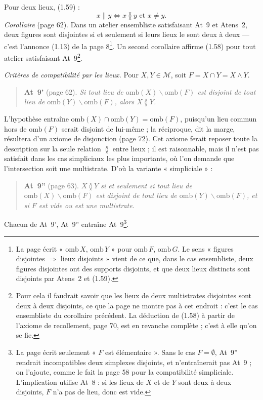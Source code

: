 \documentclass[11pt,a4paper]{article}
\begin{document}
Pour deux lieux, (1.59) :
\[
x \parallel y \iff x \between y \text{ et } x \neq y .
\]
\emph{Corollaire} (page 62). Dans un atelier ensembliste satisfaisant At~9 et
Atens~2, deux figures sont disjointes si et seulement si leurs lieux le sont deux
à deux --- c'est l'annonce (1.13) de la page 8\footnote{La page écrit
« $\mathrm{omb}\,X$, $\mathrm{omb}\,Y$ » pour $\mathrm{omb}\,F$,
$\mathrm{omb}\,G$. Le sens « figures disjointes $\Rightarrow$ lieux disjoints »
vient de ce que, dans le cas ensembliste, deux figures disjointes ont des
supports disjoints, et que deux lieux distincts sont disjoints par Atens~2 et
(1.59).}. Un second corollaire affirme (1.58) pour tout atelier satisfaisant
At~9\footnote{Pour cela il faudrait savoir que les lieux de deux multistrates
disjointes sont deux à deux disjoints, ce que la page ne montre pas à cet
endroit : c'est le cas ensembliste du corollaire précédent. La déduction de
(1.58) à partir de l'axiome de recollement, page 70, est en revanche complète ;
c'est à elle qu'on se fie.}.

\emph{Critères de compatibilité par les lieux.} Pour $X, Y \in \mathcal{M}$, soit
$F = X \cap Y = X \wedge Y$.

\begin{quote}
\textbf{At~9'} (page 62). \emph{Si tout lieu de $\mathrm{omb}(X) \smallsetminus
\mathrm{omb}(F)$ est disjoint de tout lieu de $\mathrm{omb}(Y) \smallsetminus
\mathrm{omb}(F)$, alors $X \between Y$.}
\end{quote}

L'hypothèse entraîne $\mathrm{omb}(X) \cap \mathrm{omb}(Y) = \mathrm{omb}(F)$,
puisqu'un lieu commun hors de $\mathrm{omb}(F)$ serait disjoint de lui-même ; la
réciproque, dit la marge, résultera d'un axiome de disjonction (page 72). Cet
axiome ferait reposer toute la description sur la seule relation $\between$ entre
lieux ; il est raisonnable, mais il n'est pas satisfait dans les cas simpliciaux
les plus importants, où l'on demande que l'intersection soit une multistrate.
D'où la variante « simpliciale » :

\begin{quote}
\textbf{At~9''} (page 63). \emph{$X \between Y$ si et seulement si tout lieu de
$\mathrm{omb}(X) \smallsetminus \mathrm{omb}(F)$ est disjoint de tout lieu de
$\mathrm{omb}(Y) \smallsetminus \mathrm{omb}(F)$, et si $F$ est vide ou est une
multistrate.}
\end{quote}

Chacun de At~9', At~9'' entraîne At~9\footnote{La page écrit seulement « $F$ est
élémentaire ». Sans le cas $F = \emptyset$, At~9'' rendrait incompatibles deux
simplexes disjoints, et n'entraînerait pas At~9 ; on l'ajoute, comme le fait la
page 58 pour la compatibilité simpliciale. L'implication utilise At~8 : si les
lieux de $X$ et de $Y$ sont deux à deux disjoints, $F$ n'a pas de lieu, donc est
vide.}.
\end{document}
